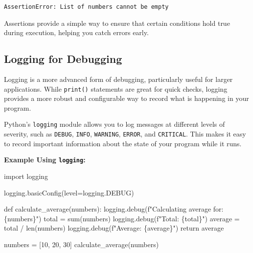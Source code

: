 \documentclass[
  letterpaper,
  DIV=11,
  numbers=noendperiod]{scrreprt}
\newenvironment{Shaded}{\begin{snugshade}}{\end{snugshade}}
\newcommand{\BuiltInTok}[1]{\textcolor[rgb]{0.00,0.23,0.31}{#1}}
\newcommand{\ControlFlowTok}[1]{\textcolor[rgb]{0.00,0.23,0.31}{#1}}
\newcommand{\DecValTok}[1]{\textcolor[rgb]{0.68,0.00,0.00}{#1}}
\newcommand{\ImportTok}[1]{\textcolor[rgb]{0.00,0.46,0.62}{#1}}
\newcommand{\KeywordTok}[1]{\textcolor[rgb]{0.00,0.23,0.31}{#1}}
\newcommand{\NormalTok}[1]{\textcolor[rgb]{0.00,0.23,0.31}{#1}}
\newcommand{\OperatorTok}[1]{\textcolor[rgb]{0.37,0.37,0.37}{#1}}
\newcommand{\SpecialCharTok}[1]{\textcolor[rgb]{0.37,0.37,0.37}{#1}}
\newcommand{\SpecialStringTok}[1]{\textcolor[rgb]{0.13,0.47,0.30}{#1}}
\begin{document}
\begin{verbatim}
AssertionError: List of numbers cannot be empty
\end{verbatim}

Assertions provide a simple way to ensure that certain conditions hold
true during execution, helping you catch errors early.

\hypertarget{logging-for-debugging}{%
\subsection{Logging for Debugging}\label{logging-for-debugging}}

Logging is a more advanced form of debugging, particularly useful for
larger applications. While \texttt{print()} statements are great for
quick checks, logging provides a more robust and configurable way to
record what is happening in your program.

Python's \texttt{logging} module allows you to log messages at different
levels of severity, such as \texttt{DEBUG}, \texttt{INFO},
\texttt{WARNING}, \texttt{ERROR}, and \texttt{CRITICAL}. This makes it
easy to record important information about the state of your program
while it runs.

\textbf{Example Using \texttt{logging}:}

\begin{Shaded}
\begin{Highlighting}[]
\ImportTok{import}\NormalTok{ logging}

\NormalTok{logging.basicConfig(level}\OperatorTok{=}\NormalTok{logging.DEBUG)}

\KeywordTok{def}\NormalTok{ calculate\_average(numbers):}
\NormalTok{    logging.debug(}\SpecialStringTok{f"Calculating average for: }\SpecialCharTok{\{}\NormalTok{numbers}\SpecialCharTok{\}}\SpecialStringTok{"}\NormalTok{)}
\NormalTok{    total }\OperatorTok{=} \BuiltInTok{sum}\NormalTok{(numbers)}
\NormalTok{    logging.debug(}\SpecialStringTok{f"Total: }\SpecialCharTok{\{}\NormalTok{total}\SpecialCharTok{\}}\SpecialStringTok{"}\NormalTok{)}
\NormalTok{    average }\OperatorTok{=}\NormalTok{ total }\OperatorTok{/} \BuiltInTok{len}\NormalTok{(numbers)}
\NormalTok{    logging.debug(}\SpecialStringTok{f"Average: }\SpecialCharTok{\{}\NormalTok{average}\SpecialCharTok{\}}\SpecialStringTok{"}\NormalTok{)}
    \ControlFlowTok{return}\NormalTok{ average}

\NormalTok{numbers }\OperatorTok{=}\NormalTok{ [}\DecValTok{10}\NormalTok{, }\DecValTok{20}\NormalTok{, }\DecValTok{30}\NormalTok{]}
\NormalTok{calculate\_average(numbers)}
\end{Highlighting}
\end{Shaded}
\end{document}
